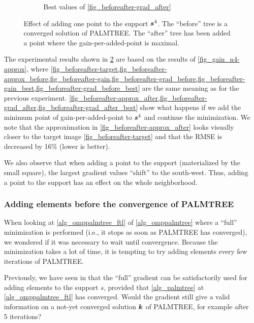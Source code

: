 \begin{figure}[!ht]
\begin{subfigure}[b]{0.32\linewidth}
\caption{Best values of \ref{fig_beforeafter-grad_after}}\label{fig_beforeafter-grad_after_best}
\end{subfigure}
\caption{Effect of adding one point to the support $\bm{s}^4$. The “before” tree is a converged solution of \ac{PALMTREE}. The “after” tree has been added a point where the gain-per-added-point is maximal.}\label{fig_beforeafter}
\end{figure}

The experimental results shown in \cref{fig_beforeafter} are based on the results of \cref{fig_gain_n4-approx}, where \cref{fig_beforeafter-target,fig_beforeafter-approx_before,fig_beforeafter-gain,fig_beforeafter-grad_before,fig_beforeafter-gain_best,fig_beforeafter-grad_before_best} are the same meaning as for the previous experiment. 
\cref{fig_beforeafter-approx_after,fig_beforeafter-grad_after,fig_beforeafter-grad_after_best} show what  happens if we add the minimum point of gain-per-added-point to $\bm{s}^4$ and continue the minimization. We note that the approximation in \cref{fig_beforeafter-approx_after} looks visually closer to the target image \cref{fig_beforeafter-target} and that the RMSE is decreased by 16\% (lower is better).

\noindent
We also observe that when adding a point to the support (materialized by the  small square), the largest gradient values “shift” to the south-west. Thus, adding a point to the support has an effect on the whole neighborhood.

\FloatBarrier
\subsubsection{Adding elements before the convergence of \ac{PALMTREE}}\label{sec_add_before_converged}

When looking at \cref{alg_omppalmtree_ftl} of \cref{alg_omppalmtree} where a “full” minimization is performed (i.e., it stops as soon as \ac{PALMTREE} has converged), we wondered if it was necessary to wait until convergence. Because the minimization takes a lot of time, it is tempting to try adding elements every few iterations of \ac{PALMTREE}.

\noindent
Previously, we have seen in  that the “full” gradient can be satisfactorily used for adding elements to the support $s$, provided that \cref{alg_palmtree} at \cref{alg_omppalmtree_ftl} has converged. Would the gradient still give a valid information on a not-yet converged solution $\bm{k}$ of \ac{PALMTREE}, for example after 5 iterations?


